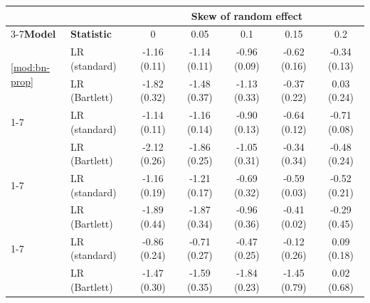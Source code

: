 \begin{tabular}{l lccccc}
\toprule
& & \multicolumn{5}{c}{\textbf{Skew of random effect}} \\\cmidrule(lr){3-7}\textbf{Model} & \textbf{Statistic} & 0 & 0.05 & 0.1 & 0.15 & 0.2 \\
\midrule
\multirow{2}{*}{\eqref{mod:bn-prop}} & LR (standard) & -1.16 (0.11) & -1.14 (0.11) & -0.96 (0.09) & -0.62 (0.16) & -0.34 (0.13) \\
 & LR (Bartlett) & -1.82 (0.32) & -1.48 (0.37) & -1.13 (0.33) & -0.37 (0.22) & 0.03 (0.24) \\
\cmidrule(lr){1-7}
\multirow{2}{*}{\eqref{mod:hn}} & LR (standard) & -1.14 (0.11) & -1.16 (0.14) & -0.90 (0.13) & -0.64 (0.12) & -0.71 (0.08) \\
 & LR (Bartlett) & -2.12 (0.26) & -1.86 (0.25) & -1.05 (0.31) & -0.34 (0.34) & -0.48 (0.24) \\
\cmidrule(lr){1-7}
\multirow{2}{*}{\eqref{mod:pn}} & LR (standard) & -1.16 (0.19) & -1.21 (0.17) & -0.69 (0.32) & -0.59 (0.03) & -0.52 (0.21) \\
 & LR (Bartlett) & -1.89 (0.44) & -1.87 (0.34) & -0.96 (0.36) & -0.41 (0.02) & -0.29 (0.45) \\
\cmidrule(lr){1-7}
\multirow{2}{*}{\eqref{mod:bn-irr}} & LR (standard) & -0.86 (0.24) & -0.71 (0.27) & -0.47 (0.25) & -0.12 (0.26) & 0.09 (0.18) \\
 & LR (Bartlett) & -1.47 (0.30) & -1.59 (0.35) & -1.84 (0.23) & -1.45 (0.79) & 0.02 (0.68) \\
\bottomrule
\end{tabular}
